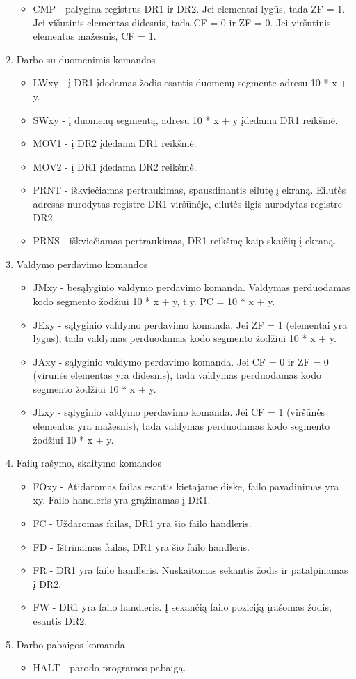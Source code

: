 \begin{enumerate}
		\begin{itemize}
		\item CMP - palygina registrus DR1 ir DR2. Jei elementai lygūs, tada ZF = 1. Jei višutinis elementas didesnis, tada CF = 0 ir  ZF = 0. Jei viršutinis elementas mažesnis, CF = 1.
		\end{itemize}
	\item Darbo su duomenimis komandos
		\begin{itemize}
		\item LWxy - į DR1 įdedamas žodis esantis duomenų segmente adresu 10 * x + y.
		\item SWxy - į duomenų segmentą, adresu 10 * x + y įdedama DR1 reikšmė.
		\item MOV1 - į DR2 įdedama DR1 reikšmė.
		\item MOV2 - į DR1 įdedama DR2 reikšmė.
		\item PRNT - iškviečiamas pertraukimas, spausdinantis eilutę į ekraną. Eilutės adresas nurodytas registre DR1 viršūnėje, eilutės ilgis nurodytas registre DR2
		\item PRNS - iškviečiamas pertraukimas, DR1 reikšmę kaip skaičių į ekraną.
		\end{itemize}
	\item Valdymo perdavimo komandos
		\begin{itemize}
		\item JMxy - besąlyginio valdymo perdavimo komanda. Valdymas perduodamas kodo segmento žodžiui 10 * x + y, t.y. PC = 10 * x + y.
		\item JExy - sąlyginio valdymo perdavimo komanda. Jei ZF = 1 (elementai yra lygūs), tada valdymas perduodamas kodo segmento žodžiui 10 * x + y.
		\item JAxy - sąlyginio valdymo perdavimo komanda. Jei CF = 0 ir ZF = 0 (virūnės elementas yra didesnis), tada valdymas perduodamas kodo segmento žodžiui 10 * x + y.
		\item JLxy  - sąlyginio valdymo perdavimo komanda. Jei CF = 1 (viršūnės elementas yra mažesnis), tada valdymas perduodamas kodo segmento žodžiui 10 * x + y.
		\end{itemize}
	\item Failų rašymo, skaitymo komandos
		\begin{itemize}
		\item FOxy - Atidaromas failas esantis kietajame diske, failo pavadinimas yra xy. Failo handleris yra grąžinamas į DR1.
		\item FC - Uždaromas failas, DR1 yra šio failo handleris.
		\item FD - Ištrinamas failas, DR1 yra šio failo handleris.
		\item FR - DR1 yra failo handleris. Nuskaitomas sekantis žodis ir patalpinamas į DR2.
		\item FW - DR1 yra failo handleris. Į sekančią failo poziciją įrašomas žodis, esantis DR2.
		\end{itemize}
	\item Darbo pabaigos komanda
		\begin{itemize}
		\item HALT - parodo programos pabaigą.
		\end{itemize}
	\end{enumerate}
